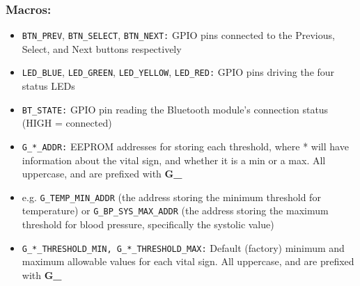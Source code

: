 \subsubsection{Macros:}
\begin{itemize}
	\item \lstinline|BTN_PREV|, \lstinline|BTN_SELECT|, \lstinline|BTN_NEXT:| GPIO pins connected to the Previous, Select, and Next buttons respectively
	\item \lstinline|LED_BLUE|, \lstinline|LED_GREEN|, \lstinline|LED_YELLOW|, \lstinline|LED_RED:| GPIO pins driving the four status LEDs
	\item \lstinline|BT_STATE:| GPIO pin reading the Bluetooth module's connection status (HIGH = connected)
	\item \lstinline|G_*_ADDR:| EEPROM addresses for storing each threshold, where * will have information about the vital sign, and whether it is a min or a max. All uppercase, and are prefixed with \textbf{G\_}
	\item[] \par\hspace*{2em} e.g. \lstinline|G_TEMP_MIN_ADDR| (the address storing the minimum threshold for temperature) or \lstinline|G_BP_SYS_MAX_ADDR| (the address storing the maximum threshold for blood pressure, specifically the systolic value)
	\item \lstinline|G_*_THRESHOLD_MIN, G_*_THRESHOLD_MAX:| Default (factory) minimum and maximum allowable values for each vital sign. All uppercase, and are prefixed with \textbf{G\_}
\end{itemize}

